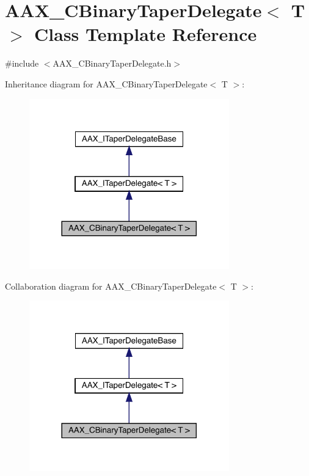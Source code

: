\hypertarget{a01457}{}\section{A\+A\+X\+\_\+\+C\+Binary\+Taper\+Delegate$<$ T $>$ Class Template Reference}
\label{a01457}


{\ttfamily \#include $<$A\+A\+X\+\_\+\+C\+Binary\+Taper\+Delegate.\+h$>$}



Inheritance diagram for A\+A\+X\+\_\+\+C\+Binary\+Taper\+Delegate$<$ T $>$\+:
\nopagebreak
\begin{figure}[H]
\begin{center}
\leavevmode
\includegraphics[width=245pt]{a01456}
\end{center}
\end{figure}


Collaboration diagram for A\+A\+X\+\_\+\+C\+Binary\+Taper\+Delegate$<$ T $>$\+:
\nopagebreak
\begin{figure}[H]
\begin{center}
\leavevmode
\includegraphics[width=245pt]{a01455}
\end{center}
\end{figure}


